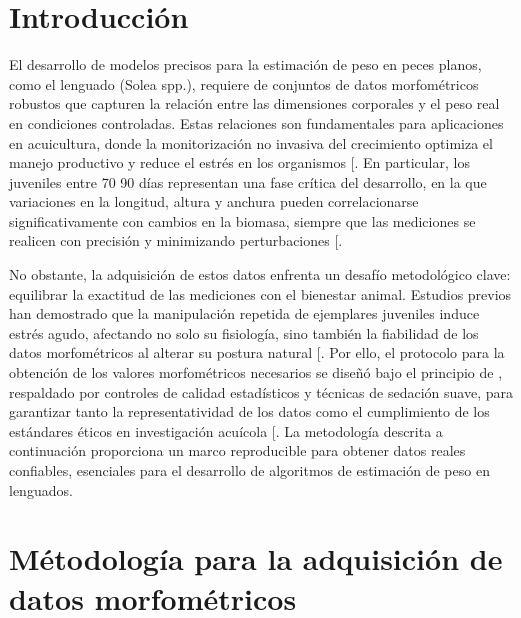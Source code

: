 \documentclass[a4paper,10pt,spanish]{jupyterBook}
\begin{document}
\section{Introducción}
\label{\detokenize{content/02/Dataset:introduccion}}
\sphinxAtStartPar
El desarrollo de modelos precisos para la estimación de peso en peces planos, como el lenguado (Solea spp.), requiere de conjuntos de datos morfométricos robustos que capturen la relación entre las dimensiones corporales y el peso real en condiciones controladas. Estas relaciones son fundamentales para aplicaciones en acuicultura, donde la monitorización no invasiva del crecimiento optimiza el manejo productivo y reduce el estrés en los organismos {[}\sphinxhref{https://doi.org/10.1371/journal.pone.0157890}{Takács et al., 2015}{]}. En particular, los juveniles entre 70 \sphinxhyphen{} 90 días representan una fase crítica del desarrollo, en la que variaciones en la longitud, altura y anchura pueden correlacionarse significativamente con cambios en la biomasa, siempre que las mediciones se realicen con precisión y minimizando perturbaciones {[}\sphinxhref{https://doi.org/10.1016/j.aquaculture.2011.03.011}{Costas et al., 2013}{]}.

\sphinxAtStartPar
No obstante, la adquisición de estos datos enfrenta un desafío metodológico clave: equilibrar la exactitud de las mediciones con el bienestar animal. Estudios previos han demostrado que la manipulación repetida de ejemplares juveniles induce estrés agudo, afectando no solo su fisiología, sino también la fiabilidad de los datos morfométricos al alterar su postura natural {[}\sphinxhref{https://link.springer.com/article/10.1007/s10695-011-9518-8}{Martins et al., 2012}{]}. Por ello, el protocolo para la obtención de los valores morfométricos necesarios se diseñó bajo el principio de , respaldado por controles de calidad estadísticos y técnicas de sedación suave, para garantizar tanto la representatividad de los datos como el cumplimiento de los estándares éticos en investigación acuícola {[}\sphinxhref{https://doi.org/10.1016/j.applanim.2004.02.003}{Conte, 2004}{]}. La metodología descrita a continuación proporciona un marco reproducible para obtener datos reales confiables, esenciales para el desarrollo de algoritmos de estimación de peso en lenguados.


\section{Métodología para la adquisición de datos morfométricos}
\label{\detokenize{content/02/Dataset:metodologia-para-la-adquisicion-de-datos-morfometricos}}
\end{document}
